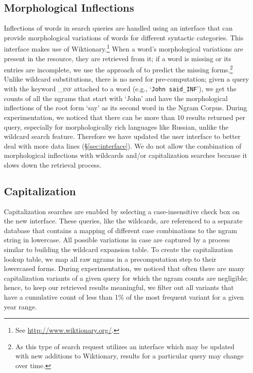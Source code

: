 \documentclass[11pt]{article}
\newcommand{\query}[1]{\texttt{#1}}
\begin{document}
\subsection{Morphological Inflections}
Inflections of words in search queries are handled using an interface that can provide morphological variations of words for different syntactic categories. This interface makes use of Wiktionary.\footnote{See \url{http://www.wiktionary.org/}.} When a word's
morphological variations are present in the resource, they are retrieved from it; if a word is missing or its entries are incomplete, we use the approach of  to predict the missing forms.\footnote{As this type of search request utilizes an interface which may be updated with new additions to Wiktionary, results for a particular query may change over time.} Unlike wildcard substitutions, there is no need for pre-computation; given a query with the keyword \textsf{\textsc{\_inf}} attached to a word (e.g., `\query{John said\_INF}'), we get the counts of all the ngrams that start with `John' and have the morphological inflections of the root form `say' as its second word in the Ngram Corpus. During experimentation, we noticed that there can be more than 10 results returned per query, especially for morphologically rich languages like Russian, unlike the wildcard search feature. Therefore we have updated the user interface to better deal with more data lines (\S\ref{sec:interface}). We do not allow the combination of morphological inflections with wildcards and/or capitalization searches because it slows down the retrieval process.

\subsection{Capitalization}
Capitalization searches are enabled by selecting a case-insensitive check box on the new interface. These queries, like the wildcards, are referenced to a separate database that contains a mapping of different case combinations to the ngram string in lowercase. All possible variations in case are captured by a process similar to building the wildcard expansion table. To create the capitalization lookup table, we map all raw ngrams in a precomputation step to their lowercased forms. During experimentation, we noticed that often there are many capitalization variants of a given query for which the ngram counts are negligible; hence, to keep our retrieved results meaningful, we filter out all variants that have a cumulative count of less than 1\% of the most frequent variant for a given year range.
\end{document}
